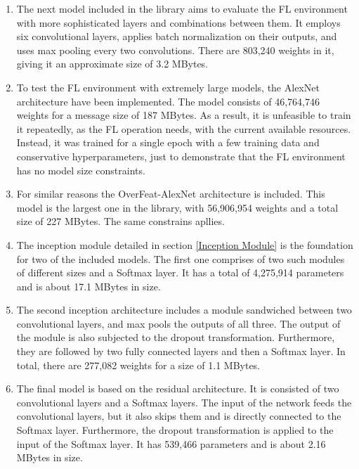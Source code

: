 \begin{enumerate}
    \item The next model included in the library aims to evaluate the FL environment with more sophisticated layers and combinations between them. It employs six convolutional layers, applies batch normalization on their outputs, and uses max pooling every two convolutions. There are 803,240 weights in it, giving it an approximate size of 3.2 MBytes.
    
    \item To test the FL environment with extremely large models, the AlexNet architecture have been implemented. The model consists of 46,764,746 weights for a message size of 187 MBytes. As a result, it is unfeasible to train it repeatedly, as the FL operation needs, with the current available resources. Instead, it was trained for a single epoch with a few training data and conservative hyperparameters, just to demonstrate that the FL environment has no model size constraints.

    \item For similar reasons the OverFeat-AlexNet architecture is included. This model is the largest one in the library, with 56,906,954 weights and a total size of 227 MBytes. The same constrains apllies.
    
    \item The inception module detailed in section \ref{Inception Module} is the foundation for two of the included models. The first one comprises of two such modules of different sizes and a Softmax layer. It has a total of 4,275,914 parameters and is about 17.1 MBytes in size.
    
    \item The second inception architecture includes a module sandwiched between two convolutional layers, and max pools the outputs of all three. The output of the module is also subjected to the dropout transformation. Furthermore, they are followed by two fully connected layers and then a Softmax layer. In total, there are 277,082 weights for a size of 1.1 MBytes.
    
    \item The final model is based on the residual architecture. It is consisted of two convolutional layers and a Softmax layers. The input of the network feeds the convolutional layers, but it also skips them and is directly connected to the Softmax layer. Furthermore, the dropout transformation is applied to the input of the Softmax layer. It has 539,466 parameters and is about 2.16 MBytes in size.
\end{enumerate}
